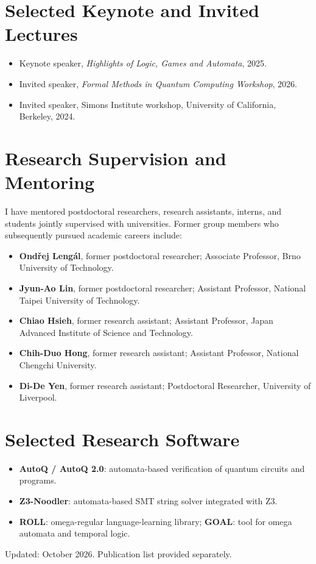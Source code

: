 \documentclass[11pt,a4paper]{article}
\begin{document}
\section{Selected Keynote and Invited Lectures}
\begin{itemize}
\item Keynote speaker, \emph{Highlights of Logic, Games and Automata}, 2025.
\item Invited speaker, \emph{Formal Methods in Quantum Computing Workshop}, 2026.
\item Invited speaker, Simons Institute workshop, University of California, Berkeley, 2024.
\end{itemize}

\section{Research Supervision and Mentoring}
I have mentored postdoctoral researchers, research assistants, interns, and students jointly supervised with universities. Former group members who subsequently pursued academic careers include:
\begin{itemize}
\item \textbf{Ond\v{r}ej Leng\'al}, former postdoctoral researcher; Associate Professor, Brno University of Technology.
\item \textbf{Jyun-Ao Lin}, former postdoctoral researcher; Assistant Professor, National Taipei University of Technology.
\item \textbf{Chiao Hsieh}, former research assistant; Assistant Professor, Japan Advanced Institute of Science and Technology.
\item \textbf{Chih-Duo Hong}, former research assistant; Assistant Professor, National Chengchi University.
\item \textbf{Di-De Yen}, former research assistant; Postdoctoral Researcher, University of Liverpool.
\end{itemize}

\section{Selected Research Software}
\begin{itemize}
\item \textbf{AutoQ / AutoQ 2.0}: automata-based verification of quantum circuits and programs.
\item \textbf{Z3-Noodler}: automata-based SMT string solver integrated with Z3.
\item \textbf{ROLL}: omega-regular language-learning library; \textbf{GOAL}: tool for omega automata and temporal logic.
\end{itemize}
\vfill
\begin{center}\footnotesize\color{muted}Updated: October 2026. Publication list provided separately.\end{center}
\end{document}
